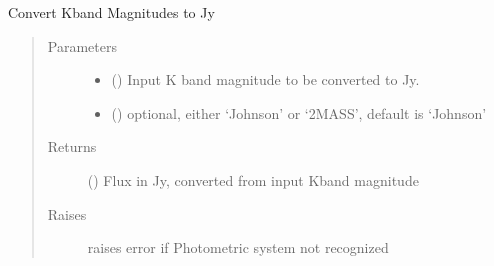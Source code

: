 \documentclass[a4paper,10pt,english]{sphinxmanual}
\begin{document}
\begin{fulllineitems}
\label{\detokenize{cascade.exoplanet_tools:cascade.exoplanet_tools.exoplanet_tools.KmagToJy}}
Convert Kband Magnitudes to Jy
\begin{quote}\begin{description}
\item[{Parameters}] \leavevmode\begin{itemize}
\item {} 
 () \textendash{} Input K band magnitude to be converted to Jy.

\item {} 
 () \textendash{} optional, either ‘Johnson’ or ‘2MASS’, default is ‘Johnson’

\end{itemize}

\item[{Returns}] \leavevmode
{} () \textendash{} Flux in Jy, converted from input Kband magnitude

\item[{Raises}] \leavevmode
{} \textendash{} raises error if Photometric system not recognized

\end{description}\end{quote}

\end{fulllineitems}

\end{document}
